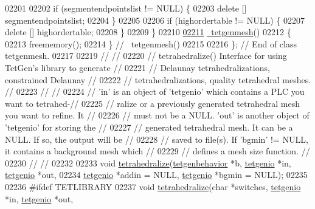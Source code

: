 \begin{DoxyCode}
02201 
02202     \textcolor{keywordflow}{if} (segmentendpointslist != NULL) \{
02203       \textcolor{keyword}{delete} [] segmentendpointslist;
02204     \}
02205 
02206     \textcolor{keywordflow}{if} (highordertable != NULL) \{
02207       \textcolor{keyword}{delete} [] highordertable;
02208     \}
02209   \}
02210 
\hypertarget{tetgen_8h_source.tex_l02211}{}\hyperlink{classtetgenmesh_a45f5fe961a2faf0adf93de742f308372}{02211}   \hyperlink{classtetgenmesh_a45f5fe961a2faf0adf93de742f308372}{~tetgenmesh}()
02212   \{
02213     freememory();
02214   \} \textcolor{comment}{// ~tetgenmesh()}
02215 
02216 \};                                               \textcolor{comment}{// End of class tetgenmesh.}
02217 
02219 \textcolor{comment}{//                                                                           //}
02220 \textcolor{comment}{// tetrahedralize()    Interface for using TetGen's library to generate      //}
02221 \textcolor{comment}{//                     Delaunay tetrahedralizations, constrained Delaunay    //}
02222 \textcolor{comment}{//                     tetrahedralizations, quality tetrahedral meshes.      //}
02223 \textcolor{comment}{//                                                                           //}
02224 \textcolor{comment}{// 'in' is an object of 'tetgenio' which contains a PLC you want to tetrahed-//}
02225 \textcolor{comment}{// ralize or a previously generated tetrahedral mesh you want to refine.  It //}
02226 \textcolor{comment}{// must not be a NULL. 'out' is another object of 'tetgenio' for storing the //}
02227 \textcolor{comment}{// generated tetrahedral mesh. It can be a NULL. If so, the output will be   //}
02228 \textcolor{comment}{// saved to file(s). If 'bgmin' != NULL, it contains a background mesh which //}
02229 \textcolor{comment}{// defines a mesh size function.                                             //}
02230 \textcolor{comment}{//                                                                           //}
02232 \textcolor{comment}{}
02233 \textcolor{keywordtype}{void} \hyperlink{tetgen_8h_ad3637eb4ffe7fda90667e67b7771d964}{tetrahedralize}(\hyperlink{classtetgenbehavior}{tetgenbehavior} *b, \hyperlink{classtetgenio}{tetgenio} *in, 
      \hyperlink{classtetgenio}{tetgenio} *out, 
02234                     \hyperlink{classtetgenio}{tetgenio} *addin = NULL, \hyperlink{classtetgenio}{tetgenio} *bgmin = NULL);
02235 
02236 \textcolor{preprocessor}{#ifdef TETLIBRARY}
02237 \textcolor{keywordtype}{void} \hyperlink{tetgen_8h_ad3637eb4ffe7fda90667e67b7771d964}{tetrahedralize}(\textcolor{keywordtype}{char} *switches, \hyperlink{classtetgenio}{tetgenio} *in, \hyperlink{classtetgenio}{tetgenio} *out,

\end{DoxyCode}
